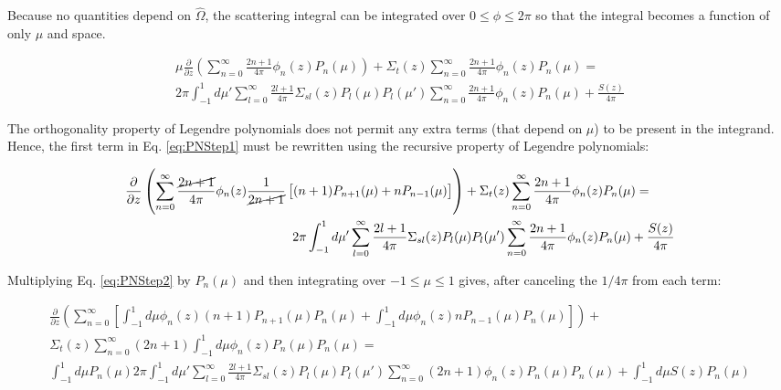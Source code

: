 \documentclass[10pt]{article}
\begin{document}
Because no quantities depend on \(\hat{\Omega}\), the scattering integral can be integrated over \(0\leq\phi\leq2\pi\) so that the integral becomes a function of only \(\mu\) and space.

\begin{equation}
\label{eq:PNStep1}
\begin{aligned}
\mu \frac{\partial}{\partial z}\left(\sum_{n=0}^{\infty}\frac{2n+1}{4\pi}\phi_n(z)P_n(\mu)\right) + \Sigma_t(z)\sum_{n=0}^{\infty}\frac{2n+1}{4\pi}\phi_n(z)P_n(\mu) =\quad\quad\\
2\pi\int_{-1}^{1} d\mu' \sum_{l=0}^{\infty}\frac{2l+1}{4\pi}\Sigma_{sl}(z)P_l(\mu)P_l(\mu')\sum_{n=0}^{\infty}\frac{2n+1}{4\pi}\phi_n(z)P_n(\mu) + \frac{S(z)}{4\pi}
 \end{aligned}
 \end{equation}
 
The orthogonality property of Legendre polynomials does not permit any extra terms (that depend on \(\mu\)) to be present in the integrand. Hence, the first term in Eq. \eqref{eq:PNStep1} must be rewritten using the recursive property of Legendre polynomials:

 \begin{equation}
\label{eq:PNStep2}
\begin{aligned}
\frac{\partial}{\partial z}\left(\sum_{n=0}^{\infty}\frac{\cancel{2n+1}}{4\pi}\phi_n(z)\frac{1}{\cancel{2n+1}} \left\lbrack(n+1)P_{n+1}(\mu) + n P_{n-1}(\mu)\right\rbrack\right) + \Sigma_t(z)\sum_{n=0}^{\infty}\frac{2n+1}{4\pi}\phi_n(z)P_n(\mu) =\quad\quad\\
2\pi\int_{-1}^{1} d\mu' \sum_{l=0}^{\infty}\frac{2l+1}{4\pi}\Sigma_{sl}(z)P_l(\mu)P_l(\mu')\sum_{n=0}^{\infty}\frac{2n+1}{4\pi}\phi_n(z)P_n(\mu) + \frac{S(z)}{4\pi}
 \end{aligned}
 \end{equation}
 
 Multiplying Eq. \eqref{eq:PNStep2} by \(P_n(\mu)\) and then integrating over \(-1\leq\mu\leq1\) gives, after canceling the \(1/4\pi\) from each term:
 
  \begin{equation}
\label{eq:PNStep3}
\begin{aligned}
\frac{\partial}{\partial z}\left(\sum_{n=0}^{\infty}\left\lbrack\int_{-1}^{1}d\mu\phi_n(z)(n+1)P_{n+1}(\mu)P_n(\mu) + \int_{-1}^{1}d\mu\phi_n(z)n P_{n-1}(\mu)P_n(\mu)\right\rbrack\right) + \quad\quad\\
\Sigma_t(z)\sum_{n=0}^{\infty}(2n+1)\int_{-1}^{1}d\mu\phi_n(z)P_n(\mu)P_n(\mu) =\quad\quad\\
\int_{-1}^{1}d\mu P_n(\mu)2\pi\int_{-1}^{1} d\mu' \sum_{l=0}^{\infty}\frac{2l+1}{4\pi}\Sigma_{sl}(z)P_l(\mu)P_l(\mu')\sum_{n=0}^{\infty}(2n+1)\phi_n(z)P_n(\mu)P_n(\mu) + \int_{-1}^{1}d\mu S(z)P_n(\mu)
 \end{aligned}
 \end{equation}
\end{document}

